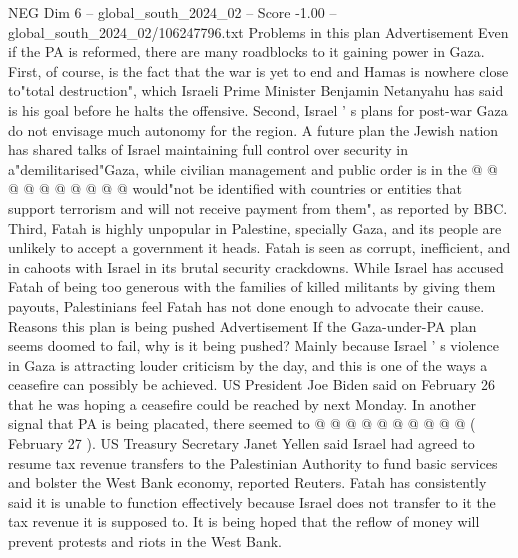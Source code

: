 \begin{textsample}{NEG Dim 6 – global\_south\_2024\_02 – Score -1.00 – global\_south\_2024\_02/106247796.txt}
Problems in this plan Advertisement Even if the PA is reformed, there are many roadblocks to it gaining power in Gaza.
First, of course, is the fact that the war is yet to end and Hamas is nowhere close to"total destruction", which Israeli Prime Minister Benjamin Netanyahu has said is his goal before he halts the offensive.
Second, Israel ' s plans for post-war Gaza do not envisage much autonomy for the region.
A future plan the Jewish nation has shared talks of Israel maintaining full control over security in a"demilitarised"Gaza, while civilian management and public order is in the @ @ @ @ @ @ @ @ @ @ would"not be identified with countries or entities that support terrorism and will not receive payment from them", as reported by BBC.
Third, Fatah is highly unpopular in Palestine, specially Gaza, and its people are unlikely to accept a government it heads.
Fatah is seen as corrupt, inefficient, and in cahoots with Israel in its brutal security crackdowns.
While Israel has accused Fatah of being too generous with the families of killed militants by giving them payouts, Palestinians feel Fatah has not done enough to advocate their cause.
Reasons this plan is being pushed Advertisement If the Gaza-under-PA plan seems doomed to fail, why is it being pushed?
Mainly because Israel ' s violence in Gaza is attracting louder criticism by the day, and this is one of the ways a ceasefire can possibly be achieved.
US President Joe Biden said on February 26 that he was hoping a ceasefire could be reached by next Monday.
In another signal that PA is being placated, there seemed to @ @ @ @ @ @ @ @ @ @ ( February 27 ).
US Treasury Secretary Janet Yellen said Israel had agreed to resume tax revenue transfers to the Palestinian Authority to fund basic services and bolster the West Bank economy, reported Reuters.
Fatah has consistently said it is unable to function effectively because Israel does not transfer to it the tax revenue it is supposed to.
It is being hoped that the reflow of money will prevent protests and riots in the West Bank.

\end{textsample}
